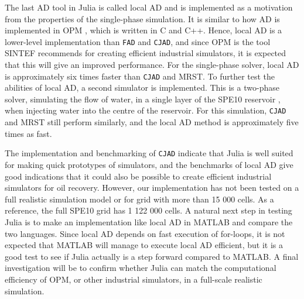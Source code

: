 The last AD tool in Julia is called local AD and is implemented as a motivation from the properties of the single-phase simulation. It is similar to how AD is implemented in OPM \emph{\citep{OPM}}, which is written in C and C++. Hence, local AD is a lower-level implementation than \texttt{FAD} and \texttt{CJAD}, and since OPM is the tool SINTEF recommends for creating efficient industrial simulators, it is expected that this will give an improved performance. For the single-phase solver, local AD is approximately six times faster than \texttt{CJAD} and MRST. To further test the abilities of local AD, a second simulator is implemented. This is a two-phase solver, simulating the flow of water, in a single layer of the SPE10 reservoir \emph{\citep{SPE10}}, when injecting water into the centre of the reservoir. For this simulation, \texttt{CJAD} and MRST still perform similarly, and the local AD method is approximately five times as fast.

The implementation and benchmarking of \texttt{CJAD} indicate that Julia is well suited for making quick prototypes of simulators, and the benchmarks of local AD give good indications that it could also be possible to create efficient industrial simulators for oil recovery. However, our implementation has not been tested on a full realistic simulation model or for grid with more than 15 000 cells. As a reference, the full SPE10 grid has 1 122 000 cells. A natural next step in testing Julia is to make an implementation like local AD in MATLAB and compare the two languages. Since local AD depends on fast execution of for-loops, it is not expected that MATLAB will manage to execute local AD efficient, but it is a good test to see if Julia actually is a step forward compared to MATLAB. A final investigation will be to confirm whether Julia can match the computational efficiency of OPM, or other industrial simulators, in a full-scale realistic simulation. 